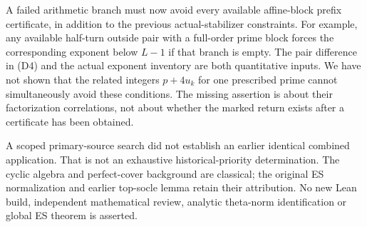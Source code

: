 A failed arithmetic branch must now avoid every available affine-block prefix
certificate, in addition to the previous actual-stabilizer constraints. For
example, any available half-turn outside pair with a full-order prime block
forces the corresponding exponent below $L-1$ if that branch is empty.
The pair difference in (D4) and the actual exponent inventory are both
quantitative inputs. We have not shown that the related integers $p+4u_k$
for one prescribed prime cannot simultaneously avoid these conditions.
The missing assertion is about their factorization correlations, not about
whether the marked return exists after a certificate has been obtained.

A scoped primary-source search did not establish an earlier identical combined
application. That is not an exhaustive historical-priority determination.
The cyclic algebra and perfect-cover background are classical; the original
ES normalization and earlier top-socle lemma retain their attribution.
No new Lean build, independent mathematical review, analytic theta-norm
identification or global ES theorem is asserted.
